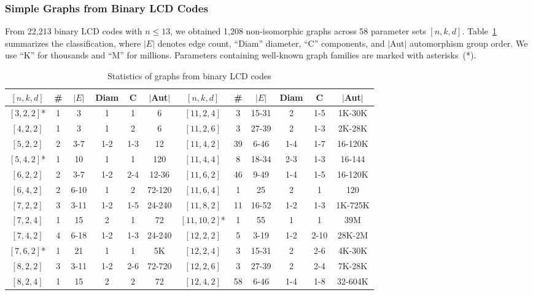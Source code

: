 \documentclass[a4paper,11pt]{article}
\theoremstyle{remark}
\begin{document}
\subsubsection{Simple Graphs from Binary LCD Codes}\label{sec:binary-classification}

From 22,213 binary LCD codes with $n \leq 13$, we obtained 1,208 non-isomorphic graphs across 58 parameter sets $[n,k,d]$.
Table~\ref{tab:binary-statistics} summarizes the classification, where $|E|$ denotes edge count, ``Diam'' diameter, ``C'' components, and $|$Aut$|$ automorphism group order.
We use ``K'' for thousands and ``M'' for millions. Parameters containing well-known graph families are marked with asterisks~(*).

\begin{table}[h]
\centering
\caption{Statistics of graphs from binary LCD codes}
\label{tab:binary-statistics}
\scriptsize
\setlength{\tabcolsep}{3pt}
\begin{tabular}{cccccc|cccccc}
\hline
$[n,k,d]$ & \# & $|E|$ & Diam & C & $|$Aut$|$ & $[n,k,d]$ & \# & $|E|$ & Diam & C & $|$Aut$|$ \\
\hline
$[3,2,2]$* & 1 & 3 & 1 & 1 & 6 & $[11,2,4]$ & 3 & 15-31 & 2 & 1-5 & 1K-30K \\
$[4,2,2]$ & 1 & 3 & 1 & 2 & 6 & $[11,2,6]$ & 3 & 27-39 & 2 & 1-3 & 2K-28K \\
$[5,2,2]$ & 2 & 3-7 & 1-2 & 1-3 & 12 & $[11,4,2]$ & 39 & 6-46 & 1-4 & 1-7 & 16-120K \\
$[5,4,2]$* & 1 & 10 & 1 & 1 & 120 & $[11,4,4]$ & 8 & 18-34 & 2-3 & 1-3 & 16-144 \\
$[6,2,2]$ & 2 & 3-7 & 1-2 & 2-4 & 12-36 & $[11,6,2]$ & 46 & 9-49 & 1-4 & 1-5 & 16-120K \\
$[6,4,2]$ & 2 & 6-10 & 1 & 2 & 72-120 & $[11,6,4]$ & 1 & 25 & 2 & 1 & 120 \\
$[7,2,2]$ & 3 & 3-11 & 1-2 & 1-5 & 24-240 & $[11,8,2]$ & 11 & 16-52 & 1-2 & 1-3 & 1K-725K \\
$[7,2,4]$ & 1 & 15 & 2 & 1 & 72 & $[11,10,2]$* & 1 & 55 & 1 & 1 & 39M \\
$[7,4,2]$ & 4 & 6-18 & 1-2 & 1-3 & 24-240 & $[12,2,2]$ & 5 & 3-19 & 1-2 & 2-10 & 28K-2M \\
$[7,6,2]$* & 1 & 21 & 1 & 1 & 5K & $[12,2,4]$ & 3 & 15-31 & 2 & 2-6 & 4K-30K \\
$[8,2,2]$ & 3 & 3-11 & 1-2 & 2-6 & 72-720 & $[12,2,6]$ & 3 & 27-39 & 2 & 2-4 & 7K-28K \\
$[8,2,4]$ & 1 & 15 & 2 & 2 & 72 & $[12,4,2]$ & 58 & 6-46 & 1-4 & 1-8 & 32-604K \\

\end{tabular}
\end{table}
\end{document}
